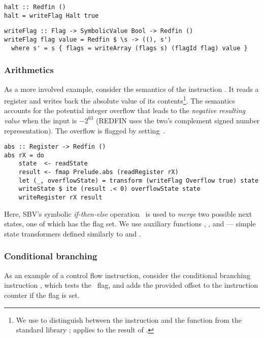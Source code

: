 \begin{verbatim}
halt :: Redfin ()
halt = writeFlag Halt true
\end{verbatim}

\begin{verbatim}
writeFlag :: Flag -> SymbolicValue Bool -> Redfin ()
writeFlag flag value = Redfin $ \s -> ((), s')
  where s' = s { flags = writeArray (flags s) (flagId flag) value }
\end{verbatim}



\subsubsection{Arithmetics}
As a more involved example, consider the semantics of the instruction .
It reads a register and writes back the absolute value of its
contents\footnote{We use  to distinguish between the instruction
and the function from the standard library ;  applies
 to the result of .}.
The semantics accounts for the potential integer overflow that leads to the
\emph{negative resulting value} when the input is $-2^{63}$ (REDFIN
uses the two's complement signed number representation). The overflow is flagged
by setting~.


\begin{verbatim}
abs :: Register -> Redfin ()
abs rX = do
    state  <- readState
    result <- fmap Prelude.abs (readRegister rX)
    let (_, overflowState) = transform (writeFlag Overflow true) state
    writeState $ ite (result .< 0) overflowState state
    writeRegister rX result
\end{verbatim}


\noindent
Here, SBV's symbolic \emph{if-then-else} operation~ is used to \emph{merge}
two possible next states, one of which has the  flag set. We use
auxiliary functions , ,  and
 --- simple state transformers defined similarly to
 and .


\subsubsection{Conditional branching}
As an example of a control flow instruction, consider the conditional branching
instruction , which tests the~ flag, and adds the
provided offset to the instruction counter if the flag is set.


